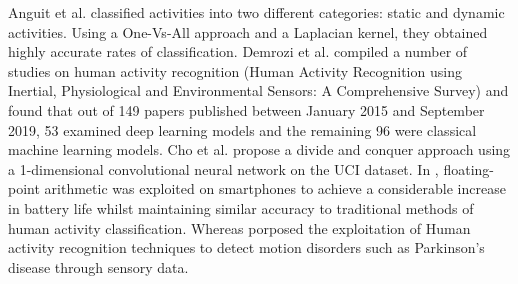 Anguit et al. \cite{Anguita2012}  classified activities into two different categories:  static and dynamic activities.
Using a One-Vs-All approach and a Laplacian kernel, they obtained highly accurate rates of classification.
Demrozi et al. \cite{Demrozi2020} compiled a number of studies on human activity recognition (Human Activity Recognition using Inertial, Physiological and Environmental Sensors: A Comprehensive Survey) and found that out of 149 papers published between January 2015 and September 2019, 53 examined deep learning models and the remaining 96 were classical machine learning models.
Cho et al. \cite{Cho2018} propose a divide and conquer approach using a 1-dimensional convolutional neural network on the UCI dataset.
In \cite{Anguita2013EnergyES}, floating-point arithmetic was exploited on smartphones to achieve a considerable increase in battery life whilst maintaining similar accuracy to traditional methods of human activity classification.
Whereas \cite{ReyesOrtiz2013HumanAA} porposed the exploitation of Human activity recognition techniques to detect motion disorders such as Parkinson's disease through sensory data.
